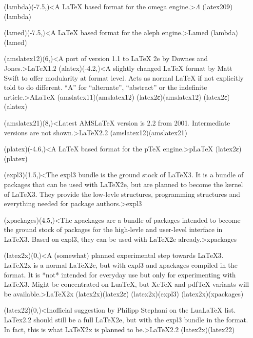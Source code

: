 {	\tonode[\experimental](lambda)(-7.5,\layer)<A LaTeX based format for the omega engine.>{$\Lambda$}
	\todraw(latex209)(lambda)
	\steplayer[-1.5]

	\tonode[\experimental](lamed)(-7.5,\layer)<A LaTeX based format for the aleph engine.>{Lamed}
	\todraw(lambda)(lamed)

	\steplayer[+1]
	\tonode(amslatex12)(6,\layer)<A port of version 1.1 to LaTeX 2e by Downes and Jones.>{\AMS\LaTeX 1.2}
	\tonode[\experimental](alatex)(-4.2,\layer)<A slightly changed LaTeX format by Matt Swift to offer modularity at format level. Acts as normal LaTeX if not explicitly told to do different. “A” for “alternate”, “abstract” or the indefinite article.>{A\LaTeX}
	\todraw(amslatex11)(amslatex12)
	\todraw(latex2ε)(amslatex12)
	\todraw(latex2ε)(alatex)
	\steplayer[-1.5]

	\tonode(amslatex21)(8,\layer)<Latest AMSLaTeX version is 2.2 from 2001. Intermediate versions are not shown.>{\AMS\LaTeX 2.2}
	\todraw(amslatex12)(amslatex21)
	\steplayer[-1.5]

	\tonode(platex)(-4.6,\layer)<A LaTeX based format for the pTeX engine.>{p\LaTeX}
	\todraw(latex2ε)(platex)
	
	\steplayer[-1.5]

	\tonode[\package](expl3)(1.5,\layer)<The expl3 bundle is the ground stock of LaTeX3. It is a bundle of packages that can be used with LaTeX2e, but are planned to become the kernel of LaTeX3. They provide the low-levle structures, programming structures and everything needed for package authors.>{expl3}

	\tonode[\package](xpackages)(4.5,\layer)<The xpackages are a bundle of packages intended to become the ground stock of packages for the high-levle and user-level interface in LaTeX3. Based on expl3, they can be used with LaTeX2e already.>{xpackages}
	\steplayer[-1.5]

	\tonode[\planned](latex2x)(0,\layer)<A (somewhat) planned experimental step towards LaTeX3. LaTeX2x is a normal LaTeX2e, but with expl3 and xpackages compiled in the format. It is *not* intended for everyday use but only for experimenting with LaTeX3. Might be concentrated on LuaTeX, but XeTeX and pdfTeX variants will be available.>{\LaTeX2x}
	\todraw(latex2x)(latex2ε)
	\todraw(latex2x)(expl3)
	\todraw(latex2x)(xpackages)
	\steplayer[-2]

	\tonode[\planned](latex22)(0,\layer)<Inofficial suggestion by Philipp Stephani on the LuaLaTeX list. LaTex2.2 should still be a full LaTeX2e, but with the expl3 bundle in the format. In fact, this is what LaTeX2x is planned to be.>{\LaTeX2.2}
	\todraw(latex2x)(latex22)
	\steplayer[-2]

}
